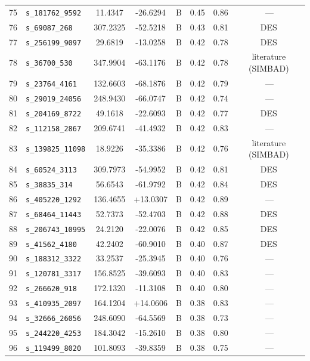 \begin{longtable}{rlcccccc}
75 & \texttt{s\_181762\_9592} & 11.4347 & -26.6294 & B & 0.45 & 0.86 & \,--- \\
76 & \texttt{s\_69087\_268} & 307.2325 & -52.5218 & B & 0.43 & 0.81 & DES \\
77 & \texttt{s\_256199\_9097} & 29.6819 & -13.0258 & B & 0.42 & 0.78 & DES \\
78 & \texttt{s\_36700\_530} & 347.9904 & -63.1176 & B & 0.42 & 0.78 & literature (SIMBAD) \\
79 & \texttt{s\_23764\_4161} & 132.6603 & -68.1876 & B & 0.42 & 0.79 & \,--- \\
80 & \texttt{s\_29019\_24056} & 248.9430 & -66.0747 & B & 0.42 & 0.74 & \,--- \\
81 & \texttt{s\_204169\_8722} & 49.1618 & -22.6093 & B & 0.42 & 0.77 & DES \\
82 & \texttt{s\_112158\_2867} & 209.6741 & -41.4932 & B & 0.42 & 0.83 & \,--- \\
83 & \texttt{s\_139825\_11098} & 18.9226 & -35.3386 & B & 0.42 & 0.76 & literature (SIMBAD) \\
84 & \texttt{s\_60524\_3113} & 309.7973 & -54.9952 & B & 0.42 & 0.81 & DES \\
85 & \texttt{s\_38835\_314} & 56.6543 & -61.9792 & B & 0.42 & 0.84 & DES \\
86 & \texttt{s\_405220\_1292} & 136.4655 & +13.0307 & B & 0.42 & 0.89 & \,--- \\
87 & \texttt{s\_68464\_11443} & 52.7373 & -52.4703 & B & 0.42 & 0.88 & DES \\
88 & \texttt{s\_206743\_10995} & 24.2120 & -22.0076 & B & 0.42 & 0.85 & DES \\
89 & \texttt{s\_41562\_4180} & 42.2402 & -60.9010 & B & 0.40 & 0.87 & DES \\
90 & \texttt{s\_188312\_3322} & 33.2537 & -25.3945 & B & 0.40 & 0.76 & \,--- \\
91 & \texttt{s\_120781\_3317} & 156.8525 & -39.6093 & B & 0.40 & 0.83 & \,--- \\
92 & \texttt{s\_266620\_918} & 172.1320 & -11.3108 & B & 0.40 & 0.80 & \,--- \\
93 & \texttt{s\_410935\_2097} & 164.1204 & +14.0606 & B & 0.38 & 0.83 & \,--- \\
94 & \texttt{s\_32666\_26056} & 248.6090 & -64.5569 & B & 0.38 & 0.73 & \,--- \\
95 & \texttt{s\_244220\_4253} & 184.3042 & -15.2610 & B & 0.38 & 0.80 & \,--- \\
96 & \texttt{s\_119499\_8020} & 101.8093 & -39.8359 & B & 0.38 & 0.75 & \,--- \\

\end{longtable}
